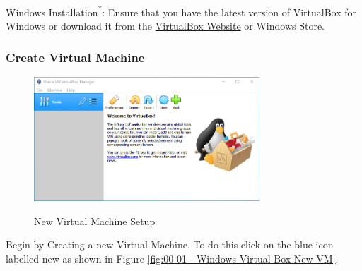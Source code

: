 Windows Installation\textsuperscript{*}: Ensure that you have the latest version\cite{WindowsVirtualBoxInstall}
of VirtualBox for Windows or download it from the \href{https://www.virtualbox.org/wiki/Downloads}{VirtualBox Website} or
Windows Store.

\let\thefootnote\relax{}

\subsubsection{Create Virtual Machine}
\begin{figure}[!htb]
    \centering
    \includegraphics[width=0.752\textwidth]{images/Win00-00.png}\\[0cm]  
    \caption[Windows Virtual Box]{New Virtual Machine Setup}
    \label{fig:00-01 - Windows Virtual Box New VM} 
\end{figure}
Begin by Creating a new Virtual Machine. To do this click on the blue icon
labelled new as shown in Figure \vref{fig:00-01 - Windows Virtual Box New VM}.


